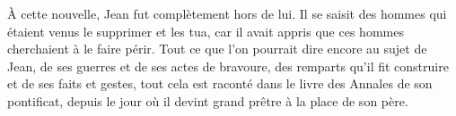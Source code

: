 À cette nouvelle, Jean fut complètement hors de lui.
Il se saisit des hommes qui étaient venus le supprimer et les tua,
	car il avait appris que ces hommes cherchaient à le faire périr.
Tout ce que l’on pourrait dire encore au sujet de Jean,
	de ses guerres et de ses actes de bravoure,
	des remparts qu’il fit construire et de ses faits et gestes,
	tout cela est raconté dans le livre des Annales de son pontificat,
	depuis le jour où il devint grand prêtre à la place de son père.
